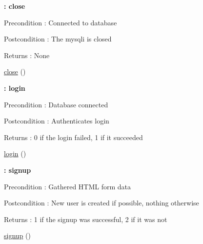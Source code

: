 \begin{Indent}{\bf \+: close}\par
{\em \begin{DoxyPrecond}{Precondition}
\+: Connected to database 
\end{DoxyPrecond}
\begin{DoxyPostcond}{Postcondition}
\+: The mysqli is closed 
\end{DoxyPostcond}
\begin{DoxyReturn}{Returns}
\+: None 
\end{DoxyReturn}
}\begin{DoxyCompactItemize}
\item 
\hyperlink{class_user_aa69c8bf1f1dcf4e72552efff1fe3e87e}{close} ()
\end{DoxyCompactItemize}
\end{Indent}
\begin{Indent}{\bf \+: login}\par
{\em \begin{DoxyPrecond}{Precondition}
\+: Database connected 
\end{DoxyPrecond}
\begin{DoxyPostcond}{Postcondition}
\+: Authenticates login 
\end{DoxyPostcond}
\begin{DoxyReturn}{Returns}
\+: 0 if the login failed, 1 if it succeeded 
\end{DoxyReturn}
}\begin{DoxyCompactItemize}
\item 
\hyperlink{class_user_aa311da27ba5706f5710cea7706c8eae1}{login} ()
\end{DoxyCompactItemize}
\end{Indent}
\begin{Indent}{\bf \+: signup}\par
{\em \begin{DoxyPrecond}{Precondition}
\+: Gathered H\+T\+ML form data 
\end{DoxyPrecond}
\begin{DoxyPostcond}{Postcondition}
\+: New user is created if possible, nothing otherwise 
\end{DoxyPostcond}
\begin{DoxyReturn}{Returns}
\+: 1 if the signup was successful, 2 if it was not 
\end{DoxyReturn}
}\begin{DoxyCompactItemize}
\item 
\hyperlink{class_user_a852ed40b79f143c1478699d908f46957}{signup} ()
\end{DoxyCompactItemize}
\end{Indent}
